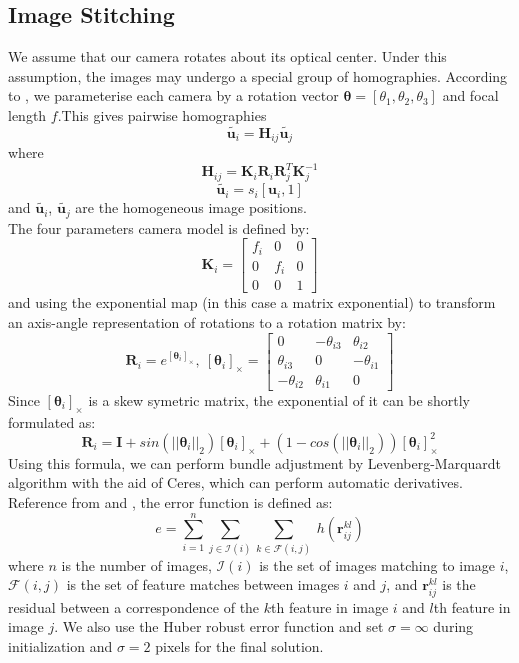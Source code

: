 \documentclass[11pt]{article}
\begin{document}
\subsection{Image Stitching}
We assume that our camera rotates about its optical center.  Under this assumption, the images may undergo a special group of homographies.
According to \cite{ref:panorama0}\cite{ref:panorama1}, we parameterise each camera by a rotation vector $\boldsymbol{\theta} = [\theta_1, \theta_2, \theta_3]$ and focal length $f$.This gives pairwise homographies $$\tilde{\boldsymbol{u}_i} = \boldsymbol{H}_{ij}\tilde{\boldsymbol{u}_j}$$ 
where $$\boldsymbol{H}_{ij} = \boldsymbol{K}_i\boldsymbol{R}_i\boldsymbol{R}^T_j\boldsymbol{K}^{-1}_j$$ $$\tilde{\boldsymbol{u}_i} = s_i[\boldsymbol{u}_i, 1]$$ 
and $\tilde{\boldsymbol{u}_i}$, $\tilde{\boldsymbol{u}_j}$ are the homogeneous image positions. \\
The four parameters camera model is defined by:
$$\boldsymbol{K}_i = \begin{bmatrix} 
  f_i &   0 & 0 \\ 
    0 & f_i & 0 \\ 
    0 &   0 & 1 \end{bmatrix}$$
and using the exponential map (in this case a matrix exponential) to transform an axis-angle representation of rotations to a rotation matrix by:
$$\boldsymbol{R}_i = e^{[\boldsymbol{\theta}_i]_{\times}},\ 
[\boldsymbol{\theta}_i]_{\times} = \begin{bmatrix} 
  0 & -\theta_{i3} & \theta_{i2} \\
  \theta_{i3} & 0 & -\theta_{i1} \\
-\theta_{i2} & \theta_{i1} & 0 \end{bmatrix}$$
Since $[\boldsymbol{\theta}_i]_{\times}$ is a skew symetric matrix, the exponential of it can be shortly formulated as:
$$\boldsymbol{R}_i = 
\boldsymbol{I} + 
sin({||\boldsymbol{\theta}_i||}_2)[\boldsymbol{\theta}_i]_{\times} +
(1-cos({||\boldsymbol{\theta}_i||}_2))[\boldsymbol{\theta}_i]^2_{\times}$$
Using this formula, we can perform bundle adjustment by Levenberg-Marquardt algorithm with the aid of Ceres, which can perform automatic derivatives.\\
Reference from \cite{ref:panorama0} and \cite{ref:panorama1}, the error function is defined as:
$$e = \sum\limits_{i=1}^n\sum\limits_{j \in \mathscr{I}(i)}\sum\limits_{k \in \mathscr{F}(i,j)}\ h(\boldsymbol{r}^{kl}_{ij})$$
where $n$ is the number of images, $\mathscr{I}(i)$ is the set of images matching to image $i$, $\mathscr{F}(i, j)$ is the set of feature matches between images $i$ and $j$, and $\boldsymbol{r}^{kl}_{ij}$ is the residual between a correspondence of the $k$th feature in image $i$ and $l$th feature in image $j$. We also use the Huber robust error function and set $\sigma = \infty$ during initialization and $\sigma = 2$ pixels for the final solution.
\end{document}
